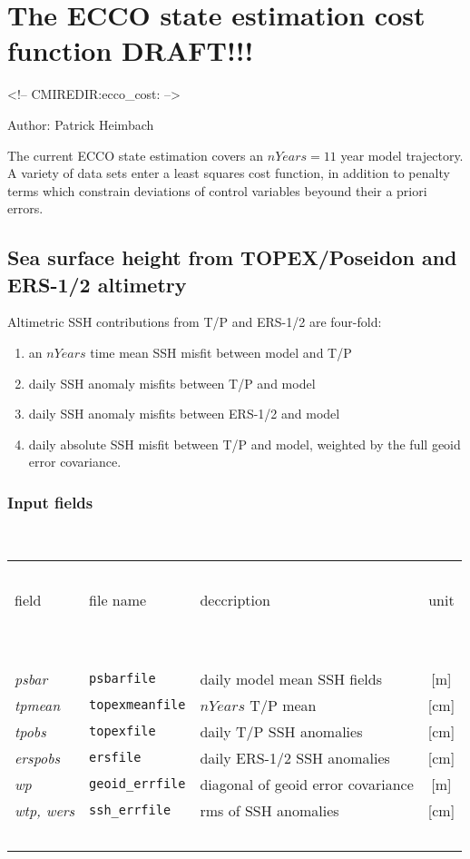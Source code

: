 \section{The ECCO state estimation cost function DRAFT!!!
\label{sectioneccocost}}
\begin{rawhtml}
<!-- CMIREDIR:ecco_cost: -->
\end{rawhtml}

Author: Patrick Heimbach

The current ECCO state estimation covers an $nYears = 11$ year
model trajectory.
A variety of data sets enter a least squares cost function,
in addition to penalty terms which constrain deviations
of control variables beyound their a priori errors.

\subsection{Sea surface height from TOPEX/Poseidon and ERS-1/2 altimetry}

Altimetric SSH contributions from T/P and ERS-1/2 are four-fold:
%
\begin{enumerate}
%
\item 
an $nYears$ time mean SSH misfit between
model and T/P
%
\item
daily SSH anomaly misfits between T/P and model
%
\item
daily SSH anomaly misfits between ERS-1/2 and model
%
\item
daily absolute SSH misfit between T/P and model,
weighted by the full geoid error covariance.
%
\end{enumerate}

\subsubsection{Input fields}
~

\begin{table}[h!]
\begin{center}
\begin{tabular}{lllc}
\hline \hline
~&~&~&~\\
field & file name & deccription & unit \\
~&~&~&~\\
\hline
~&~&~&~\\
{\it psbar} & {\tt psbarfile} & daily model mean SSH fields & [m] \\
{\it tpmean} & {\tt topexmeanfile} & $nYears$ T/P mean & [cm] \\
{\it tpobs}  & {\tt topexfile} & daily T/P SSH anomalies & [cm] \\
{\it erspobs}  & {\tt ersfile} & daily ERS-1/2 SSH anomalies & [cm] \\
{\it wp} & {\tt geoid\_errfile} & diagonal of geoid error covariance & [m] \\
{\it wtp, wers} & {\tt ssh\_errfile} & rms of SSH anomalies & [cm] \\
~&~&~&~\\
\hline \hline
\end{tabular}
\end{center}
\end{table}


